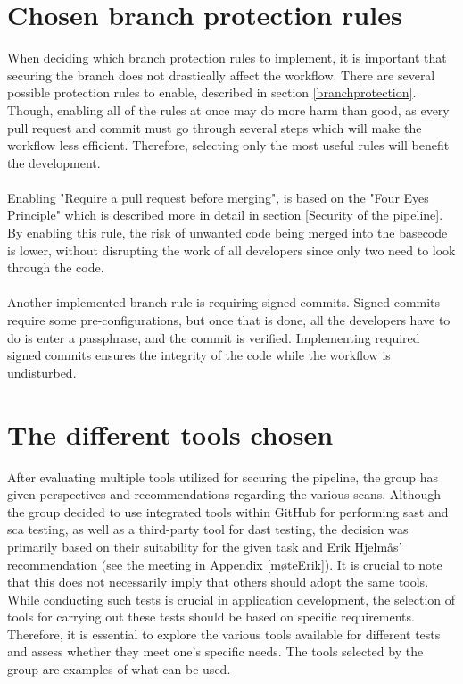 \section{Chosen branch protection rules}
When deciding which branch protection rules to implement, it is important that securing the branch does not drastically affect the workflow. There are several possible protection rules to enable, described in section \ref{branchprotection}. Though, enabling all of the rules at once may do more harm than good, as every pull request and commit must go through several steps which will make the workflow less efficient. Therefore, selecting only the most useful rules will benefit the development. 
\\~\\
Enabling "Require a pull request before merging", is based on the "Four Eyes Principle" which is described more in detail in section \ref{Security of the pipeline}. By enabling this rule, the risk of unwanted code being merged into the basecode is lower, without disrupting the work of all developers since only two need to look through the code. \cite{foureyes} 
\\~\\
Another implemented branch rule is requiring signed commits. Signed commits require some pre-configurations, but once that is done, all the developers have to do is enter a passphrase, and the commit is verified. Implementing required signed commits ensures the integrity of the code while the workflow is undisturbed.

\section{The different tools chosen}
After evaluating multiple tools utilized for securing the pipeline, the group has given perspectives and recommendations regarding the various scans. Although the group decided to use integrated tools within GitHub for performing \acrshort{sast} and \acrshort{sca} testing, as well as a third-party tool for \acrshort{dast} testing, the decision was primarily based on their suitability for the given task and Erik Hjelmås' recommendation (see the meeting in Appendix \ref{møteErik}). It is crucial to note that this does not necessarily imply that others should adopt the same tools. While conducting such tests is crucial in application development, the selection of tools for carrying out these tests should be based on specific requirements. Therefore, it is essential to explore the various tools available for different tests and assess whether they meet one's specific needs. The tools selected by the group are examples of what can be used. 

